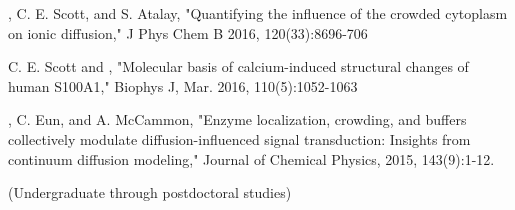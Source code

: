 \begin{etaremune}
\item \pmkh, C. E. Scott, and S. Atalay, "Quantifying the influence of the crowded cytoplasm on ionic diffusion," J Phys Chem B 2016, 120(33):8696-706 
\item C. E. Scott and \pmkh, "Molecular basis of calcium-induced structural changes of human S100A1," Biophys J, Mar. 2016, 110(5):1052-1063 
\item \pmkh, C. Eun, and A. McCammon, "Enzyme localization, crowding, and buffers collectively modulate diffusion-influenced signal transduction: Insights from continuum diffusion modeling," Journal of Chemical Physics, 2015, 143(9):1-12. 
\vspace{10pt}
\end{etaremune}
\centerline{ (Undergraduate through postdoctoral studies)}
